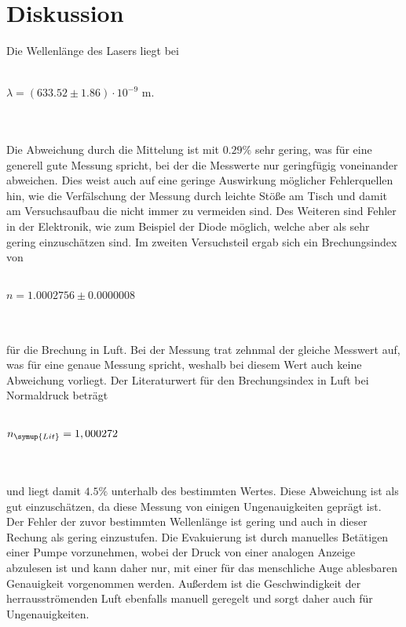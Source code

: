 \section{Diskussion}
\label{sec:Diskussion}
Die Wellenlänge des Lasers liegt bei 
\\ \\
    \centerline{$\lambda = (633.52 \pm 1.86) \cdot 10^{-9} $ m.}
\\ \\
Die Abweichung durch die Mittelung ist mit $0.29 \%$ sehr gering, was für eine generell gute Messung spricht, bei der die Messwerte 
nur geringfügig voneinander abweichen. Dies weist auch auf eine geringe Auswirkung möglicher Fehlerquellen hin, wie die Verfälschung der 
Messung durch leichte Stöße am Tisch und damit am Versuchsaufbau die nicht immer zu vermeiden sind. Des Weiteren sind Fehler in der Elektronik, 
wie zum Beispiel der Diode möglich, welche aber als sehr gering einzuschätzen sind.
Im zweiten Versuchsteil ergab sich ein Brechungsindex von 
 \\ \\
    \centerline{$n = 1.0002756 \pm 0.0000008$}
\\ \\
für die Brechung in Luft. Bei der Messung trat zehnmal der gleiche Messwert auf, was für eine genaue Messung spricht, weshalb bei 
diesem Wert auch keine Abweichung vorliegt. 
Der Literaturwert für den Brechungsindex in Luft bei Normaldruck beträgt 
\\ \\
    \centerline{$n_{\symup{Lit}} = 1,000272 $ \cite{spektrum}}
\\ \\
und liegt damit $4.5 \%$ unterhalb des bestimmten Wertes. Diese Abweichung ist als gut einzuschätzen, da diese Messung von einigen
Ungenauigkeiten geprägt ist.
Der Fehler der zuvor bestimmten Wellenlänge ist gering und auch in dieser Rechung als gering einzustufen. 
Die Evakuierung ist durch manuelles Betätigen einer Pumpe vorzunehmen, wobei der Druck
von einer analogen Anzeige abzulesen ist und kann daher nur, mit einer für das menschliche Auge ablesbaren Genauigkeit vorgenommen werden.
Außerdem ist die Geschwindigkeit der herrausströmenden Luft 
ebenfalls manuell geregelt und sorgt daher auch für Ungenauigkeiten.
